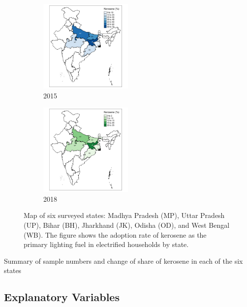 \documentclass[11pt,english]{article}
\theoremstyle{plain} \newtheorem{claim}{Claim}
\theoremstyle{plain} \newtheorem{prop}{Proposition}
\theoremstyle{plain} \newtheorem{hypo}{Hypothesis}
\begin{document}
\begin{figure}
\centering
\begin{subfigure}[b]{\textwidth}
\centering
\includegraphics[width=0.5\textwidth]{Figures/Map_2015.pdf}
\caption{2015}
\end{subfigure}
\begin{subfigure}[b]{\textwidth}
\centering
\includegraphics[width=0.5\textwidth]{Figures/Map_2018.pdf}
\caption{2018}
\end{subfigure}
\caption{Map of six surveyed states: Madhya Pradesh (MP), Uttar Pradesh (UP), Bihar (BH), Jharkhand (JK), Odisha (OD), and West Bengal (WB). The figure shows the adoption rate of kerosene as the primary lighting fuel in electrified households by state.}
\label{map}
\end{figure}

\begin{table}[ht!]
\centering

\caption{Summary of sample numbers and change of share of kerosene in each of the six states}
\label{states}
\end{table}

\subsection{Explanatory Variables}
\end{document}
